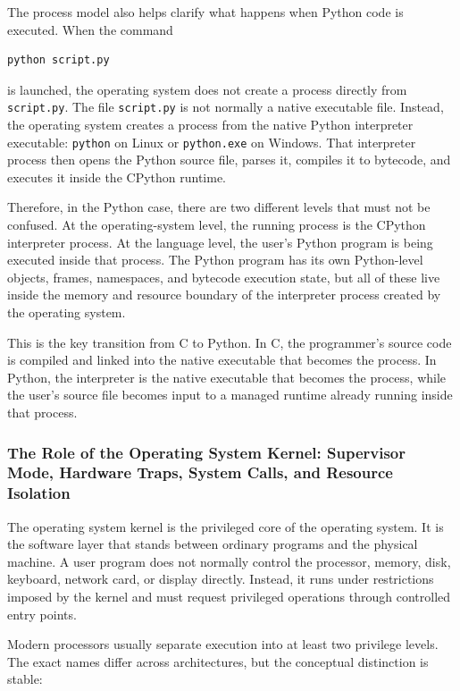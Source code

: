 The process model also helps clarify what happens when Python code is executed. When the command

\begin{verbatim}
python script.py
\end{verbatim}

is launched, the operating system does not create a process directly from \texttt{script.py}. The file \texttt{script.py} is not normally a native executable file. Instead, the operating system creates a process from the native Python interpreter executable: \texttt{python} on Linux or \texttt{python.exe} on Windows. That interpreter process then opens the Python source file, parses it, compiles it to bytecode, and executes it inside the CPython runtime.

Therefore, in the Python case, there are two different levels that must not be confused. At the operating-system level, the running process is the CPython interpreter process. At the language level, the user's Python program is being executed inside that process. The Python program has its own Python-level objects, frames, namespaces, and bytecode execution state, but all of these live inside the memory and resource boundary of the interpreter process created by the operating system.

This is the key transition from C to Python. In C, the programmer's source code is compiled and linked into the native executable that becomes the process. In Python, the interpreter is the native executable that becomes the process, while the user's source file becomes input to a managed runtime already running inside that process.

\subsubsection{The Role of the Operating System Kernel: Supervisor Mode, Hardware Traps, System Calls, and Resource Isolation}

The operating system kernel is the privileged core of the operating system. It is the software layer that stands between ordinary programs and the physical machine. A user program does not normally control the processor, memory, disk, keyboard, network card, or display directly. Instead, it runs under restrictions imposed by the kernel and must request privileged operations through controlled entry points.

Modern processors usually separate execution into at least two privilege levels. The exact names differ across architectures, but the conceptual distinction is stable:

